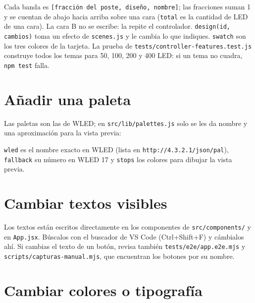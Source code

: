 
Cada banda es \texttt{[fracción del poste, diseño, nombre]}; las fracciones suman 1 y se cuentan de abajo hacia arriba sobre una cara (\texttt{total} es la cantidad de LED de una cara). La cara B no se escribe: la repite el controlador. \texttt{design(id, cambios)} toma un efecto de \texttt{scenes.js} y le cambia lo que indiques. \texttt{swatch} son los tres colores de la tarjeta. La prueba de \texttt{tests/controller-features.test.js} construye todos los temas para 50, 100, 200 y 400 LED: si un tema no cuadra, \texttt{npm test} falla.

\section{Añadir una paleta}

Las paletas son las de WLED; en \texttt{src/lib/palettes.js} solo se les da nombre y una aproximación para la vista previa:


\texttt{wled} es el nombre exacto en WLED (lista en \texttt{http://4.3.2.1/json/pal}), \texttt{fallback} su número en WLED 17 y \texttt{stops} los colores para dibujar la vista previa.

\section{Cambiar textos visibles}

Los textos están escritos directamente en los componentes de \texttt{src/components/} y en \texttt{App.jsx}. Búscalos con el buscador de VS Code (Ctrl+Shift+F) y cámbialos ahí. Si cambias el texto de un botón, revisa también \texttt{tests/e2e/app.e2e.mjs} y \texttt{scripts/capturas-manual.mjs}, que encuentran los botones por su nombre.

\section{Cambiar colores o tipografía}

